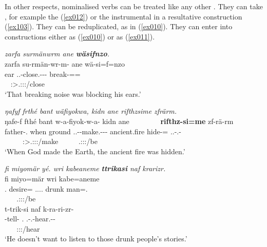 In other respects, nominalised verbs can be treated like any other . They can take , for example the  (\ref{ex012}) or the instrumental in a resultative construction (\ref{ex103}). They can be reduplicated, as in (\ref{ex010}). They can enter into  constructions either as  (\ref{ex010}) or as  (\ref{ex011}).

\begin{exe}
	\ex \textit{zarfa surmänwrm ane \textbf{wäsifnzo}.}\\
	\glll zarfa su-rmän-wr-m-\Zero{} ane wä-si=f=nzo\\
	ear \Tsg.\Masc.\Betatwo-close.\Ext-\Ndu-\Dur-\Stnsg{} {\Dem} break-{\Nmlz}={\Erg}={\Only}\\
	~ {\footnotesize \Stsg:\Sbj>\Tsg.\Masc:\Obj:\Pst:\Dur/close} ~ ~\\
	\trans `That breaking noise was blocking his ears.' 
	\label{ex012}
\end{exe}
\begin{exe}
	\ex \emph{ŋafyf frthé bant wäfiyokwa, kidn ane rifthzsime zfrärm.}\\
	\glll ŋafe-f fthé bant w-a-fiyok-w-a-\Zero{} kidn ane~~~~~~~~  \textbf{rifthz-si=me} zf-rä-rm\\
	father-\Erg.{\Sg} when ground \Tsg.\F.\Alph-\Vc-make.\Ext-\Ndu-\Pst-\Stsg{} ancient.fire {\Dem} hide-{\Nmlz}={\Ins} \Tsg.\F.\Betatwo-\Cop.\Ndu-\Dur\\
	~ ~ ~ {\footnotesize \Stsg:\Sbj>\Tsg.\F:\Obj:\Pst:\Ipfv/make} ~ ~ ~ {\footnotesize \Tsg.\F:\Sbj:\Pst:\Dur/be}\\
	\trans `When God made the Earth, the ancient fire was hidden.'
	\label{ex103}
\end{exe}
\begin{exe}
	\ex \textit{fi miyomär yé. wri kabeaneme \textbf{ttrikasi} naf krarizr.}\\
	\glll fi miyo=mär  wri kabe=aneme\\
	\Third.{\Abs} desire={\Priv} \Tsg.\Masc.\Alph.\Cop.{\Ndu} drunk man={\Poss}.{\Nsg}\\
	~ ~ {\footnotesize \Tsg.\Masc:\Sbj:\Nonpast:\Ipfv/be} ~ ~\\
	\sn
	\glll t-trik-si naf k-ra-ri-zr-\Zero{}\\
	\Redup-tell-{\Nmlz} \Tsg.{\Erg} \M.\Bet-\Irr.\Vc-hear.\Ext-\Ndu-\Stsg{}\\
	~ ~ {\footnotesize \Stsg:\Sbj:\Irr:\Ipfv/hear}\\
	\trans `He doesn't want to listen to those drunk people's stories.'
	\label{ex010}
\end{exe}
